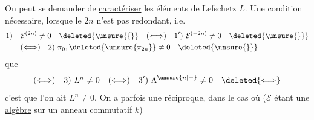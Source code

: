 On peut se demander de \uline{caractériser} les  éléments de Lefschetz $L$. Une condition nécessaire, lorsque le  $2n$ n'est pas redondant, i.e.
\[
\begin{aligned}
1)\quad&\mathcal E^{(2n)}\neq0\quad\deleted{\unsure{\{}}\quad(\Longleftrightarrow)\quad1')\ \mathcal E^{(-2n)}\neq0\quad\deleted{\unsure{\}}}\\
&(\Longleftrightarrow)\quad2)\ \pi_0,\deleted{\unsure{\pi_{2n}}}\neq0\quad\deleted{\unsure{\}}}
\end{aligned}
\]
que
\[
(\Longleftrightarrow)\quad3)\ L^n\neq0\quad(\Longleftrightarrow)\quad3')\ \Lambda^{\unsure{n|-}}\neq0\quad\deleted{\Longleftrightarrow}
\]
c'est que l'on ait $L^n\neq0$. On a parfois une réciproque, dans le cas où ($\mathcal E$ étant une \uline{algèbre} sur un anneau commutatif $k$)

